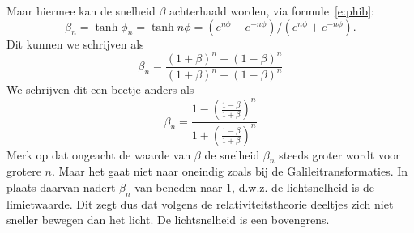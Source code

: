 Maar hiermee kan de snelheid $\beta$ achterhaald worden, via formule~\ref{e:phib}:
\begin{equation}
\beta_n = \tanh \phi_n = \tanh n\phi = (e^{n\phi}-e^{-n\phi})/(e^{n\phi}+e^{-n\phi}).
\end{equation}
Dit kunnen we schrijven als
\begin{equation}
\beta_n=\frac{(1+\beta)^n-(1-\beta)^n}{(1+\beta)^n + (1-\beta)^n}
\end{equation}
We schrijven dit een beetje anders als
\begin{equation}
\beta_n = \frac{1-\left(\frac{1-\beta}{1+\beta}\right)^n}{1+\left(\frac{1-\beta}{1+\beta}\right)^n}
\end{equation}
Merk op dat ongeacht de waarde van $\beta$ de snelheid $\beta_n$
steeds groter wordt voor grotere $n$. Maar het gaat niet naar oneindig
zoals bij de Galileitransformaties. In plaats daarvan nadert
$\beta_n$ van beneden naar 1, d.w.z. de lichtsnelheid is de
limietwaarde. Dit zegt dus dat volgens de relativiteitstheorie deeltjes
zich niet sneller bewegen dan het licht. De lichtsnelheid is een
bovengrens.

